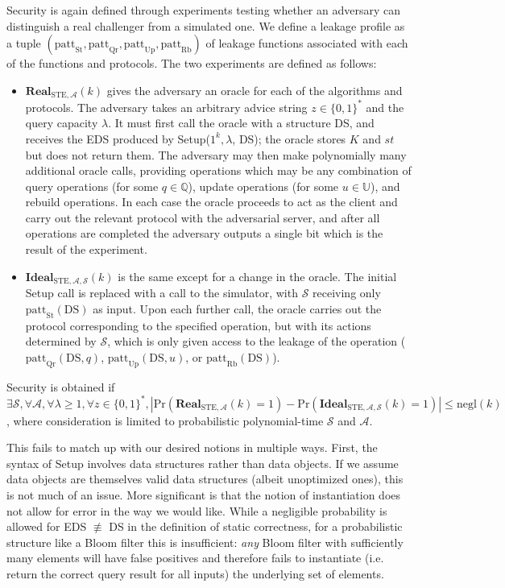 \documentclass[11pt, pdftex]{article}
\begin{document}
Security is again defined through experiments testing whether an adversary can distinguish a real challenger from a simulated one. We define a leakage profile as a tuple $(\mathrm{patt}_{\mathrm{St}},\mathrm{patt}_{\mathrm{Qr}},\mathrm{patt}_{\mathrm{Up}},\mathrm{patt}_{\mathrm{Rb}})$ of leakage functions associated with each of the functions and protocols. The two experiments are defined as follows:
\begin{itemize}
	\item $\mathbf{Real}_{\mathrm{STE},\mathcal{A}}(k)$ gives the adversary an oracle for each of the algorithms and protocols. The adversary takes an arbitrary advice string $z \in \{0,1\}^*$ and the query capacity $\lambda$. It must first call the oracle with a structure DS, and receives the EDS produced by Setup($1^k,\lambda$, DS); the oracle stores $K$ and $st$ but does not return them. The adversary may then make polynomially many additional oracle calls, providing operations which may be any combination of query operations (for some $q \in \mathbb{Q}$), update operations (for some $u \in \mathbb{U}$), and rebuild operations. In each case the oracle proceeds to act as the client and carry out the relevant protocol with the adversarial server, and after all operations are completed the adversary outputs a single bit which is the result of the experiment.
	\item $\mathbf{Ideal}_{\mathrm{STE},\mathcal{A},\mathcal{S}}(k)$ is the same except for a change in the oracle. The initial Setup call is replaced with a call to the simulator, with $\mathcal{S}$ receiving only $\mathrm{patt}_{\mathrm{St}}(\mathrm{DS})$ as input. Upon each further call, the oracle carries out the protocol corresponding to the specified operation, but with its actions determined by $\mathcal{S}$, which is only given access to the leakage of the operation ($\mathrm{patt}_{\mathrm{Qr}}(\mathrm{DS},q)$, $\mathrm{patt}_{\mathrm{Up}}(\mathrm{DS},u)$, or $\mathrm{patt}_{\mathrm{Rb}}(\mathrm{DS})$).
\end{itemize}

Security is obtained if $\exists \mathcal{S}, \forall \mathcal{A}, \forall \lambda \ge 1, \forall z \in \{0,1\}^*, |\mathrm{Pr}(\mathbf{Real}_{\mathrm{STE},\mathcal{A}}(k) = 1) - \mathrm{Pr}(\mathbf{Ideal}_{\mathrm{STE},\mathcal{A},\mathcal{S}}(k) = 1)| \le \mathrm{negl}(k)$, where consideration is limited to probabilistic polynomial-time $\mathcal{S}$ and $\mathcal{A}$.

This fails to match up with our desired notions in multiple ways. First, the syntax of Setup involves data structures rather than data objects. If we assume data objects are themselves valid data structures (albeit unoptimized ones), this is not much of an issue. More significant is that the notion of instantiation does not allow for error in the way we would like. While a negligible probability is allowed for EDS $\not\equiv$ DS in the definition of static correctness, for a probabilistic structure like a Bloom filter this is insufficient: {\em any} Bloom filter with sufficiently many elements will have false positives and therefore fails to instantiate (i.e. return the correct query result for all inputs) the underlying set of elements.
\end{document}
